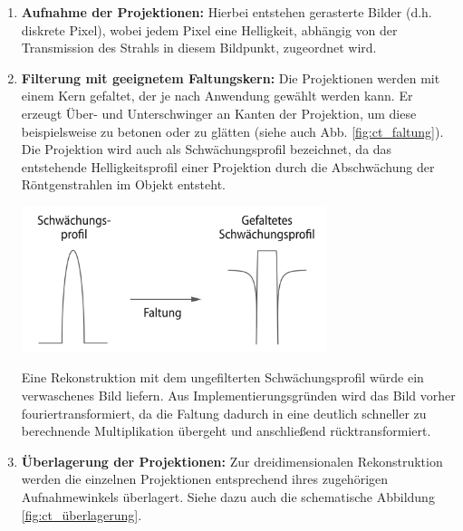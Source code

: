 \documentclass[11pt, a4paper]{article}
\numberwithin{equation}{section}
\begin{document}
\begin{enumerate}
	\item \textbf{Aufnahme der Projektionen:} Hierbei entstehen gerasterte Bilder (d.h. diskrete Pixel), wobei jedem Pixel eine Helligkeit, abhängig von der Transmission des Strahls in diesem Bildpunkt, zugeordnet wird.
	\item \textbf{Filterung mit geeignetem Faltungskern:} Die Projektionen werden mit einem Kern gefaltet, der je nach Anwendung gewählt werden kann.
	Er erzeugt Über- und Unterschwinger an Kanten der Projektion, um diese beispielsweise zu betonen oder zu glätten (siehe auch Abb. \ref{fig:ct_faltung}).
	Die Projektion wird auch als Schwächungsprofil bezeichnet, da das entstehende Helligkeitsprofil einer Projektion durch die Abschwächung der Röntgenstrahlen im Objekt entsteht. 
	\begin{minipage}[ht]{\linewidth}
		\centering
	   \includegraphics[width=0.7\textwidth]{./figures/ct/faltung.jpg}
		\label{fig:ct_faltung}
		\medskip
	\end{minipage}
	Eine Rekonstruktion mit dem ungefilterten Schwächungsprofil würde ein verwaschenes Bild liefern.
	Aus Implementierungsgründen wird das Bild vorher fouriertransformiert, da die Faltung dadurch in eine deutlich schneller zu berechnende Multiplikation übergeht und anschließend rücktransformiert.
	\item \textbf{Überlagerung der Projektionen:} Zur dreidimensionalen Rekonstruktion werden die einzelnen Projektionen entsprechend ihres zugehörigen Aufnahmewinkels überlagert.
	Siehe dazu auch die schematische Abbildung \ref{fig:ct_überlagerung}.
	

\end{enumerate}
\end{document}
